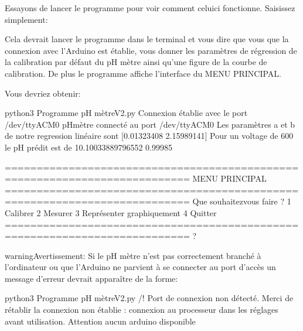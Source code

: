 \documentclass[letterpaper,10pt,french]{sphinxmanual}
\begin{document}
\sphinxAtStartPar
Essayons de lancer le programme pour voir comment celui\sphinxhyphen{}ci fonctionne. Saisissez simplement:

\begin{sphinxVerbatim}[commandchars=\\\{\}]
 
\end{sphinxVerbatim}

\sphinxAtStartPar
Cela devrait lancer le programme dans le terminal et vous dire que vous que la connexion avec l’Arduino est établie,
vous donner les paramètres de régression de la calibration par défaut du pH mètre ainsi qu’une figure de la courbe de calibration. De plus le programme affiche l’interface
du MENU PRINCIPAL.

\sphinxAtStartPar
Vous devriez obtenir:

\begin{sphinxVerbatim}[commandchars=\\\{\}]
\PYGZhy{}\PYGZgt{} python3 \PYGZsq{}Programme pH mètre\PYGZus{}V2.py\PYGZsq{}
Connexion établie avec le port /dev/ttyACM0
pH\PYGZhy{}mètre connecté  au port /dev/ttyACM0
Les paramètres a et b de notre regression linéaire sont [0.01323408 2.15989141]
Pour un voltage de 600 le pH prédit est de 10.10033889796552
0.99985

    ===========================================================================
    MENU PRINCIPAL
    ===========================================================================
    Que souhaitez\PYGZhy{}vous faire ?
    1 \PYGZhy{} Calibrer
    2 \PYGZhy{} Mesurer
    3 \PYGZhy{} Représenter graphiquement
    4 \PYGZhy{} Quitter
    ===========================================================================
    ?
\end{sphinxVerbatim}

\begin{sphinxadmonition}{warning}{Avertissement:}
\sphinxAtStartPar
Si le pH mètre n’est pas correctement branché à l’ordinateur
ou que l’Arduino ne parvient à se connecter au port d’accès un message d’erreur devrait apparaître de la forme:

\begin{sphinxVerbatim}[commandchars=\\\{\}]
\PYGZhy{}\PYGZgt{} python3 \PYGZsq{}Programme pH mètre\PYGZus{}V2.py\PYGZsq{}
/!\PYGZbs{} Port de connexion non détecté. Merci de rétablir la connexion non établie : connexion au processeur dans les réglages avant utilisation.
Attention aucun arduino disponible
\end{sphinxVerbatim}
\end{sphinxadmonition}
\end{document}
